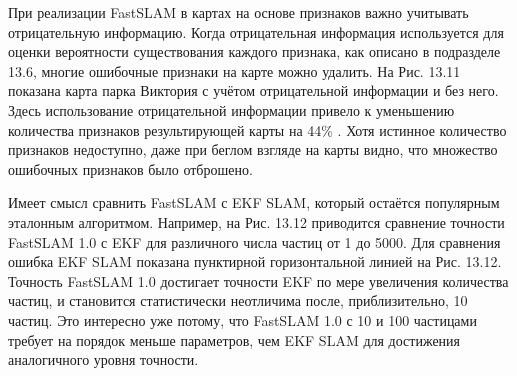 \documentclass[10pt,a4paper]{article}
\begin{document}
При реализации FastSLAM в картах на основе признаков важно учитывать отрицательную информацию. Когда отрицательная информация используется для оценки вероятности существования каждого признака, как описано в подразделе 13.6, многие ошибочные признаки на карте можно удалить. На Рис. 13.11 показана карта парка Виктория с учётом отрицательной информации и без него. Здесь использование отрицательной информации привело к уменьшению количества признаков результирующей карты на 44\% . Хотя истинное количество признаков недоступно, даже при беглом взгляде на карты видно, что множество ошибочных признаков было отброшено.

Имеет смысл сравнить FastSLAM с EKF SLAM, который остаётся популярным эталонным алгоритмом. Например, на Рис. 13.12 приводится сравнение точности FastSLAM 1.0 с EKF для различного числа частиц от 1 до 5000. Для сравнения ошибка EKF SLAM  показана пунктирной горизонтальной линией на Рис. 13.12. Точность FastSLAM 1.0 достигает точности EKF по мере увеличения количества частиц, и становится статистически неотличима после, приблизительно, 10 частиц. Это интересно уже потому, что FastSLAM 1.0 с 10 и 100 частицами требует на порядок меньше параметров, чем EKF SLAM для достижения аналогичного уровня точности.
\end{document}
